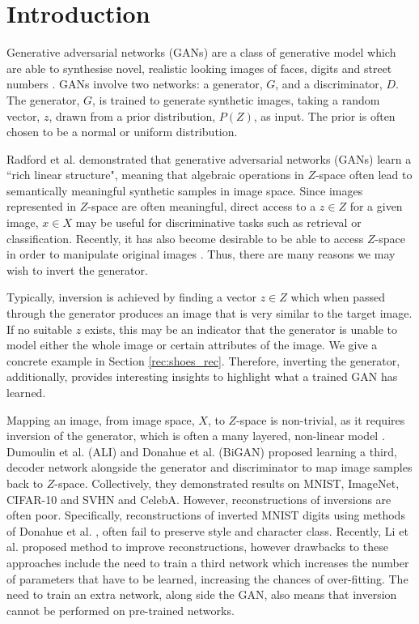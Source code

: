 \documentclass[journal]{IEEEtran}
\begin{document}
\section{Introduction}

Generative adversarial networks (GANs) \cite{radford2015unsupervised, goodfellow2014generative} are a class of generative model which are able to synthesise novel, realistic looking images of faces, digits and street numbers \cite{radford2015unsupervised}. GANs involve two networks: a generator, $G$, and a discriminator, $D$. The generator, $G$, is trained to generate synthetic images, taking a random vector, $z$, drawn from a prior distribution, $P(Z)$, as input. The prior is often chosen to be a normal or uniform distribution.

Radford et al. \cite{radford2015unsupervised} demonstrated that generative adversarial networks (GANs) learn a ``rich linear structure", meaning that algebraic operations in $Z$-space often lead to semantically meaningful synthetic samples in image space. Since images represented in $Z$-space are often meaningful, direct access to a $z \in Z$ for a given image, $x \in X$ may be useful for discriminative tasks such as retrieval or classification. Recently, it has also become desirable to be able to access $Z$-space in order to manipulate original images \cite{zhu2016generative}. Thus, there are many reasons we may wish to invert the generator.

Typically, inversion is achieved by finding a vector $z \in Z$ which when passed through the generator produces an image that is very similar to the target image. If no suitable $z$ exists, this may be an indicator that the generator is unable to model either the whole image or certain attributes of the image. We give a concrete example in Section \ref{rec:shoes_rec}. Therefore, inverting the generator, additionally, provides interesting insights to highlight what a trained GAN has learned.



Mapping an image, from image space, $X$, to $Z$-space is non-trivial, as it requires inversion of the generator, which is often a many layered, non-linear model \cite{radford2015unsupervised, goodfellow2014generative, chen2016infogan}. Dumoulin et al. \cite{dumoulin2016adversarially} (ALI) and Donahue et al. (BiGAN) \cite{donahue2016adversarial} proposed learning a third, decoder network alongside the generator and discriminator to map image samples back to $Z$-space. Collectively, they demonstrated results on MNIST, ImageNet, CIFAR-10 and SVHN and CelebA. However, reconstructions of inversions are often poor. Specifically, reconstructions of inverted MNIST digits using methods of Donahue et al. \cite{donahue2015long}, often fail to preserve style and character class. Recently, Li et al. \cite{li2017alice} proposed method to improve reconstructions, however drawbacks to these approaches \cite{li2017alice, donahue2016adversarial, dumoulin2016adversarially} include the need to train a third network which increases the number of parameters that have to be learned, increasing the chances of over-fitting. The need to train an extra network, along side the GAN, also means that inversion cannot be performed on pre-trained networks.
\end{document}
